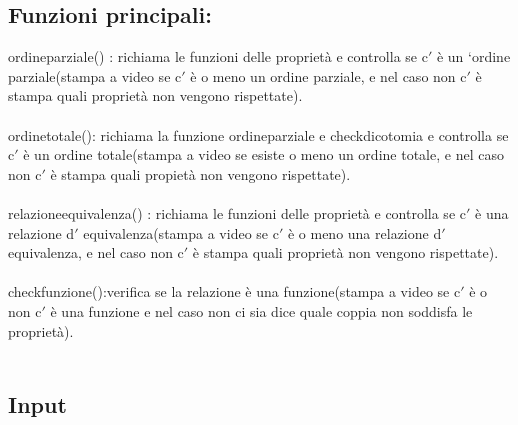 \documentclass[11pt, a4paper, titlepage, block]{article}
\begin{document}
	\subsection{Funzioni principali:}
	ordine\textunderscore parziale() : richiama le funzioni delle propriet\`a e controlla se c$'$ \`e un ‘ordine parziale(stampa a video se c$'$ \`e o meno un ordine parziale, e nel caso non c$'$ \`e stampa quali propriet\`a non vengono rispettate).\\
	\\
	ordine\textunderscore totale(): richiama la funzione ordine\textunderscore parziale e check\textunderscore dicotomia e controlla se c$'$ \`e un ordine totale(stampa a video se esiste o meno un ordine totale, e nel caso non c$'$ \`e stampa quali propiet\`a non vengono rispettate).\\
	\\
	relazione\textunderscore equivalenza() : richiama le funzioni delle propriet\`a e controlla se c$'$ \`e una relazione d$'$ equivalenza(stampa a video se c$'$ \`e o meno una relazione d$'$ equivalenza, e nel caso non c$'$ \`e stampa quali propriet\`a non vengono rispettate).\\
	\\
	check\textunderscore funzione():verifica se la relazione \`e una funzione(stampa  a video se c$'$ \`e o non c$'$ \`e una funzione e nel caso non ci sia dice quale coppia non soddisfa le propriet\`a).\\
	\\
	\newpage        
	\subsection{Input}
	
\end{document}
